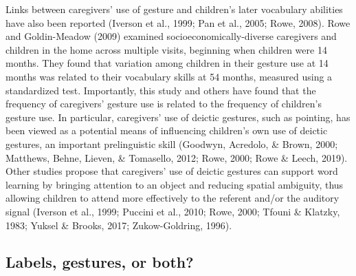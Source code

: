 \documentclass[
  man,mask,floatsintext]{apa6}
\begin{document}
Links between caregivers' use of gesture and children's later vocabulary abilities have also been reported (Iverson et al., 1999; Pan et al., 2005; Rowe, 2008). Rowe and Goldin-Meadow (2009) examined socioeconomically-diverse caregivers and children in the home across multiple visits, beginning when children were 14 months. They found that variation among children in their gesture use at 14 months was related to their vocabulary skills at 54 months, measured using a standardized test. Importantly, this study and others have found that the frequency of caregivers' gesture use is related to the frequency of children's gesture use. In particular, caregivers' use of deictic gestures, such as pointing, has been viewed as a potential means of influencing children's own use of deictic gestures, an important prelinguistic skill (Goodwyn, Acredolo, \& Brown, 2000; Matthews, Behne, Lieven, \& Tomasello, 2012; Rowe, 2000; Rowe \& Leech, 2019). Other studies propose that caregivers' use of deictic gestures can support word learning by bringing attention to an object and reducing spatial ambiguity, thus allowing children to attend more effectively to the referent and/or the auditory signal (Iverson et al., 1999; Puccini et al., 2010; Rowe, 2000; Tfouni \& Klatzky, 1983; Yuksel \& Brooks, 2017; Zukow-Goldring, 1996).

\hypertarget{labels-gestures-or-both}{%
\subsection{Labels, gestures, or both?}\label{labels-gestures-or-both}}
\end{document}
